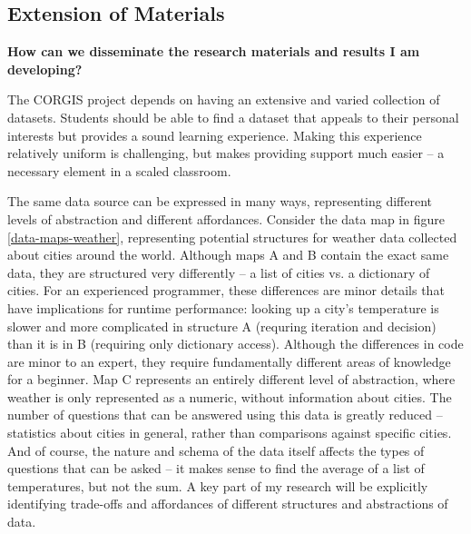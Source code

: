 \subsection{Extension of Materials}

\textbf{How can we disseminate the research materials and results I am developing?}

The CORGIS project depends on having an extensive and varied collection of datasets. 
Students should be able to find a dataset that appeals to their personal interests but provides a sound learning experience.
Making this experience relatively uniform is challenging, but makes providing support much easier -- a necessary element in a scaled classroom.

The same data source can be expressed in many ways, representing different levels of abstraction and different affordances.
Consider the data map in figure \ref{data-maps-weather}, representing potential structures for weather data collected about cities around the world.
Although maps A and B contain the exact same data, they are structured very differently -- a list of cities vs. a dictionary of cities.
For an experienced programmer, these differences are minor details that have implications for runtime performance: looking up a city's temperature is slower and more complicated in structure A (requring iteration and decision) than it is in B (requiring only dictionary access).
Although the differences in code are minor to an expert, they require fundamentally different areas of knowledge for a beginner.
Map C represents an entirely different level of abstraction, where weather is only represented as a numeric, without information about cities.
The number of questions that can be answered using this data is greatly reduced -- statistics about cities in general, rather than comparisons against specific cities.
And of course, the nature and schema of the data itself affects the types of questions that can be asked -- it makes sense to find the average of a list of temperatures, but not the sum.
A key part of my research will be explicitly identifying trade-offs and affordances of different structures and abstractions of data.

